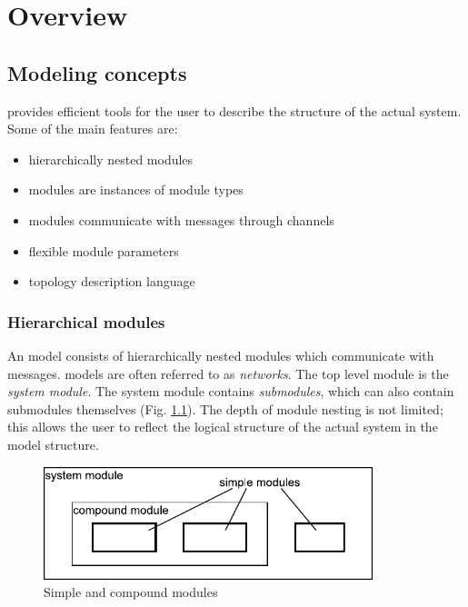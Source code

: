 \chapter{Overview}
\label{cha:overview}


\section{Modeling concepts}

{\opp} provides efficient tools for the user to describe the
structure of the actual system. Some of the main features are:
\begin{itemize}
\item{hierarchically nested modules}
\item{modules are instances of module types}
\item{modules communicate with messages through channels}
\item{flexible module parameters}
\item{topology description language}
\end{itemize}

\subsection{Hierarchical modules}


An {\opp} model consists of hierarchically nested
modules which communicate with messages.
{\opp} models are often referred to as \textit{networks}. The top
level module is the \textit{system module}.  The system module
contains \textit{submodules}, which can also contain submodules
themselves (Fig. \ref{fig:ch-overview:modules}). The depth of module
nesting is not limited; this allows the user to reflect the logical
structure of the actual system in the model structure.

\begin{figure}[htbp]
\begin{center}
\includegraphics[width=3.772in, height=1.292in]{figures/usmanFig2}
\caption{Simple and compound modules}
\label{fig:ch-overview:modules}
\end{center}
\end{figure}


